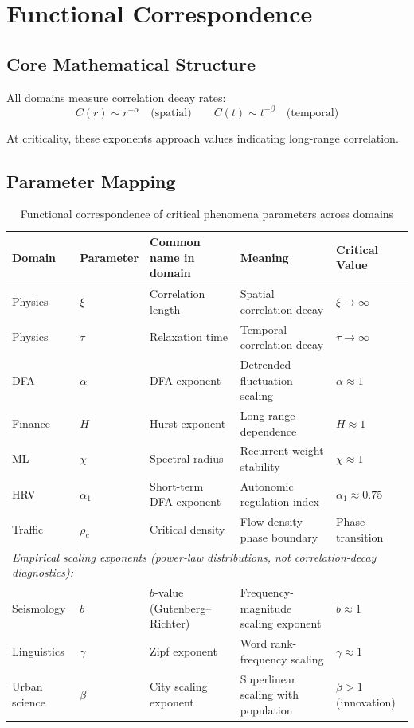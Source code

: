 \documentclass[11pt]{article}
\begin{document}
\section{Functional Correspondence}
\label{sec:correspondence}

\subsection{Core Mathematical Structure}

All domains measure correlation decay rates:
\begin{equation}
C(r) \sim r^{-\alpha} \quad \text{(spatial)} \qquad C(t) \sim t^{-\beta} \quad \text{(temporal)}
\end{equation}

At criticality, these exponents approach values indicating long-range correlation.

\subsection{Parameter Mapping}

\begin{table}[ht]
\centering
\caption{Functional correspondence of critical phenomena parameters across domains}
\label{tab:equiv}
{\small
\begin{tabular}{lllll}
\toprule
\textbf{Domain} & \textbf{Parameter} & \textbf{Common name in domain} & \textbf{Meaning} & \textbf{Critical Value} \\
\midrule
Physics & $\xi$ & Correlation length & Spatial correlation decay & $\xi \to \infty$ \\
Physics & $\tau$ & Relaxation time & Temporal correlation decay & $\tau \to \infty$ \\
DFA & $\alpha$ & DFA exponent & Detrended fluctuation scaling & $\alpha \approx 1$ \\
Finance & $H$ & Hurst exponent & Long-range dependence & $H \approx 1$ \\
ML & $\chi$ & Spectral radius & Recurrent weight stability & $\chi \approx 1$ \\
HRV & $\alpha_1$ & Short-term DFA exponent & Autonomic regulation index & $\alpha_1 \approx 0.75$\rlap{$^*$} \\
Traffic & $\rho_c$ & Critical density & Flow-density phase boundary & Phase transition \\
\midrule
\multicolumn{5}{l}{\textit{Empirical scaling exponents (power-law distributions, not correlation-decay diagnostics):}} \\
Seismology & $b$ & $b$-value (Gutenberg--Richter) & Frequency-magnitude scaling exponent & $b \approx 1$ \\
Linguistics & $\gamma$ & Zipf exponent & Word rank-frequency scaling & $\gamma \approx 1$ \\
Urban science & $\beta$ & City scaling exponent & Superlinear scaling with population & $\beta > 1$ (innovation) \\
\bottomrule
\end{tabular}
}
\end{table}
\end{document}
